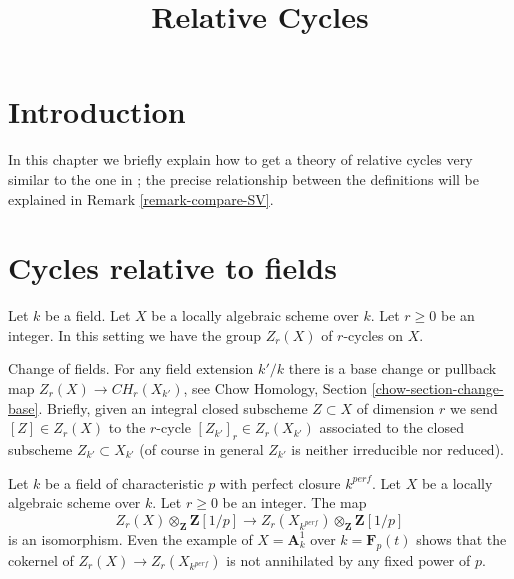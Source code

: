 

%


\title{Relative Cycles}


\maketitle

\label{section-phantom}

\tableofcontents



\section{Introduction}
\label{section-introduction}

\noindent
In this chapter we briefly explain how to get a theory of relative cycles
very similar to the one in \cite{SV}; the precise relationship between the
definitions will be explained in Remark \ref{remark-compare-SV}.



\section{Cycles relative to fields}
\label{section-relative-fields}

\noindent
Let $k$ be a field. Let $X$ be a locally algebraic scheme over $k$.
Let $r \geq 0$ be an integer. In this setting we have the group
$Z_r(X)$ of $r$-cycles on $X$.

\medskip\noindent
Change of fields. For any field extension $k'/k$ there is a base change or
pullback map $Z_r(X) \to CH_r(X_{k'})$, see
Chow Homology, Section \ref{chow-section-change-base}.
Briefly, given an integral closed subscheme $Z \subset X$
of dimension $r$ we send $[Z] \in Z_r(X)$ to the $r$-cycle
$[Z_{k'}]_r \in Z_r(X_{k'})$ associated to the closed subscheme
$Z_{k'} \subset X_{k'}$ (of course in general $Z_{k'}$
is neither irreducible nor reduced).

\begin{remark}
\label{remark-how-different}
Let $k$ be a field of characteristic $p$ with perfect closure $k^{perf}$.
Let $X$ be a locally algebraic scheme over $k$. Let $r \geq 0$ be an integer.
The map
$$
Z_r(X) \otimes_\mathbf{Z} \mathbf{Z}[1/p]
\longrightarrow
Z_r(X_{k^{perf}}) \otimes_\mathbf{Z} \mathbf{Z}[1/p]
$$
is an isomorphism. Even the example of $X = \mathbf{A}^1_k$
over $k = \mathbf{F}_p(t)$ shows that the cokernel of
$Z_r(X) \to Z_r(X_{k^{perf}})$ is not annihilated by any
fixed power of $p$.
\end{remark}







